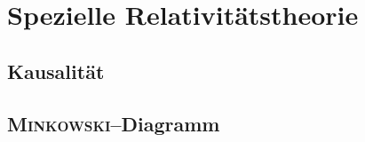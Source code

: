 \newpage
\section{Spezielle Relativitätstheorie}
\subsection{Kausalität}
\subsection{\textsc{Minkowski}--Diagramm}

